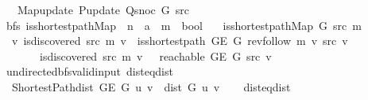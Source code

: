 \begin{isabellebody}
\ \ \ \ Map{\isacharunderscore}{\kern0pt}update\ P{\isacharunderscore}{\kern0pt}update\ Q{\isacharunderscore}{\kern0pt}snoc\ G\ src{\isachardoublequoteclose}%
\isadelimdocument
%
\endisadelimdocument
%
\isatagdocument
%
\isamarkuptrue%
%
\endisatagdocument
{\isafolddocument}%
%
\isadelimdocument
%
\endisadelimdocument
{}\isamarkupfalse%
\ {\isacharparenleft}{\kern0pt}\ bfs{\isacharparenright}{\kern0pt}\ is{\isacharunderscore}{\kern0pt}shortest{\isacharunderscore}{\kern0pt}path{\isacharunderscore}{\kern0pt}Map\ {\isacharcolon}{\kern0pt}{\isacharcolon}{\kern0pt}\ {\isachardoublequoteopen}{\isacharprime}{\kern0pt}n\ {\isasymRightarrow}\ {\isacharprime}{\kern0pt}a\ {\isasymRightarrow}\ {\isacharprime}{\kern0pt}m\ {\isasymRightarrow}\ bool{\isachardoublequoteclose}\ \isanewline
\ \ {\isachardoublequoteopen}is{\isacharunderscore}{\kern0pt}shortest{\isacharunderscore}{\kern0pt}path{\isacharunderscore}{\kern0pt}Map\ G\ src\ m\ {\isasymequiv}\isanewline
\ \ \ {\isasymforall}v{\isachardot}{\kern0pt}\ {\isacharparenleft}{\kern0pt}is{\isacharunderscore}{\kern0pt}discovered\ src\ m\ v\ {\isasymlongrightarrow}\ is{\isacharunderscore}{\kern0pt}shortest{\isacharunderscore}{\kern0pt}path\ {\isacharparenleft}{\kern0pt}G{\isachardot}{\kern0pt}E\ G{\isacharparenright}{\kern0pt}\ {\isacharparenleft}{\kern0pt}rev{\isacharunderscore}{\kern0pt}follow\ m\ v{\isacharparenright}{\kern0pt}\ src\ v{\isacharparenright}{\kern0pt}\ {\isasymand}\isanewline
\ \ \ \ \ \ \ {\isacharparenleft}{\kern0pt}{\isasymnot}\ is{\isacharunderscore}{\kern0pt}discovered\ src\ m\ v\ {\isasymlongrightarrow}\ {\isasymnot}\ reachable\ {\isacharparenleft}{\kern0pt}G{\isachardot}{\kern0pt}E\ G{\isacharparenright}{\kern0pt}\ src\ v{\isacharparenright}{\kern0pt}{\isachardoublequoteclose}\isanewline
\isanewline
{}\isamarkupfalse%
\ {\isacharparenleft}{\kern0pt}\ undirected{\isacharunderscore}{\kern0pt}bfs{\isacharunderscore}{\kern0pt}valid{\isacharunderscore}{\kern0pt}input{\isacharparenright}{\kern0pt}\ dist{\isacharunderscore}{\kern0pt}eq{\isacharunderscore}{\kern0pt}dist{\isacharcolon}{\kern0pt}\isanewline
\ \ \ {\isachardoublequoteopen}Shortest{\isacharunderscore}{\kern0pt}Path{\isachardot}{\kern0pt}dist\ {\isacharparenleft}{\kern0pt}G{\isachardot}{\kern0pt}E\ G{\isacharparenright}{\kern0pt}\ u\ v\ {\isacharequal}{\kern0pt}\ dist\ G\ u\ v{\isachardoublequoteclose}\isanewline
%
\isadelimproof
\ \ %
\endisadelimproof
%
\isatagproof
{}\isamarkupfalse%
\ dist{\isacharunderscore}{\kern0pt}eq{\isacharunderscore}{\kern0pt}dist\isanewline

\end{isabellebody}
